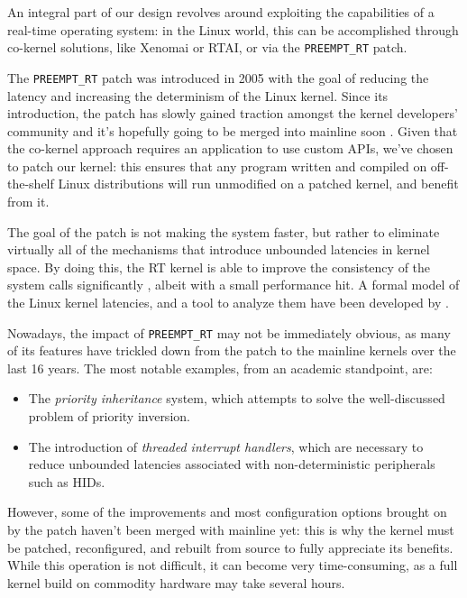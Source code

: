 \documentclass[a4paper,12pt]{report}
\begin{document}
An integral part of our design revolves around exploiting the capabilities of a real-time operating system: in the Linux world, this can be accomplished through co-kernel solutions, like Xenomai or RTAI, or via the \texttt{PREEMPT\_RT} patch.

The \texttt{PREEMPT\_RT} patch was introduced in 2005 with the goal of reducing the latency and increasing the determinism of the Linux kernel. Since its introduction, the patch has slowly gained traction amongst the kernel developers' community and it's hopefully going to be merged into mainline soon \cite{lwn-rt-future}. Given that the co-kernel approach requires an application to use custom APIs, we've chosen to patch our kernel: this ensures that any program written and compiled on off-the-shelf Linux distributions will run unmodified on a patched kernel, and benefit from it.

The goal of the patch is not making the system faster, but rather to eliminate virtually all of the mechanisms that introduce unbounded latencies in kernel space. By doing this, the RT kernel is able to improve the consistency of the system calls significantly \cite{dmoceri-benchmarking-rtlinux}, albeit with a small performance hit. A formal model of the Linux kernel latencies, and a tool to analyze them have been developed by \textcite{demistifying-rt-latency}.

Nowadays, the impact of \texttt{PREEMPT\_RT} may not be immediately obvious, as many of its features have trickled down from the patch to the mainline kernels over the last 16 years. The most notable examples, from an academic standpoint, are:

\begin{itemize}
    \item The \textit{priority inheritance} system, which attempts to solve the well-discussed problem of priority inversion.
    \item The introduction of \textit{threaded interrupt handlers}, which are necessary to reduce unbounded latencies associated with non-deterministic peripherals such as HIDs.
\end{itemize}

However, some of the improvements and most configuration options brought on by the patch haven't been merged with mainline yet: this is why the kernel must be patched, reconfigured, and rebuilt from source to fully appreciate its benefits. While this operation is not difficult, it can become very time-consuming, as a full kernel build on commodity hardware may take several hours.
\end{document}
